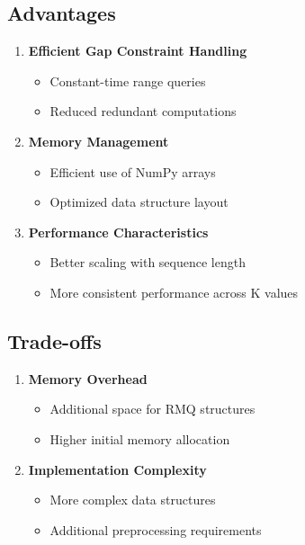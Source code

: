 \documentclass{article}
\begin{document}
\subsection{Advantages}
\begin{enumerate}
    \item \textbf{Efficient Gap Constraint Handling}
    \begin{itemize}
        \item Constant-time range queries
        \item Reduced redundant computations
    \end{itemize}

    \item \textbf{Memory Management}
    \begin{itemize}
        \item Efficient use of NumPy arrays
        \item Optimized data structure layout
    \end{itemize}

    \item \textbf{Performance Characteristics}
    \begin{itemize}
        \item Better scaling with sequence length
        \item More consistent performance across K values
    \end{itemize}
\end{enumerate}

\subsection{Trade-offs}
\begin{enumerate}
    \item \textbf{Memory Overhead}
    \begin{itemize}
        \item Additional space for RMQ structures
        \item Higher initial memory allocation
    \end{itemize}

    \item \textbf{Implementation Complexity}
    \begin{itemize}
        \item More complex data structures
        \item Additional preprocessing requirements
    \end{itemize}
\end{enumerate}
\end{document}
